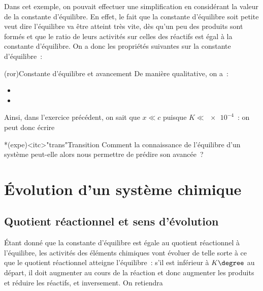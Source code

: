 \documentclass[../../main/main.tex]{subfiles}
\begin{document}
Dans cet exemple, on pouvait effectuer une simplification en considérant la
valeur de la constante d'équilibre. En effet, le fait que la constante
d'équilibre soit petite veut dire l'équilibre va être atteint très vite, dès
qu'un peu des produits sont formés et que le ratio de leurs activités sur celles
des réactifs est égal à la constante d'équilibre. On a donc les propriétés
suivantes sur la constante d'équilibre~:

\begin{tcb}[label=prop:K](ror){Constante d'équilibre et avancement}
	De manière qualitative, on a~:
	\begin{itemize}
		\item {}
		\item {}
	\end{itemize}
\end{tcb}

Ainsi, dans l'exercice précédent, on sait que $x \ll c$ puisque $K \ll
	\num{e-4}$~: on peut donc écrire
\psw{
\[
	K = \frac{x_f{}^2}{c}
	\Lra
	x_f = \sqrt{Kc} = \SI{1.33e-3}{mol.L^{-1}}
\]
}

\begin{tcb}*(expe)<itc>"trans"{Transition}
	Comment la connaissance de l'équilibre d'un système peut-elle alors nous
	permettre de prédire son avancée~?
\end{tcb}

\section{Évolution d'un système chimique}
\subsection{Quotient réactionnel et sens d'évolution}

Étant donné que la constante d'équilibre est égale au quotient réactionnel à
l'équilibre, les activités des éléments chimiques vont évoluer de telle sorte à
ce que le quotient réactionnel atteigne l'équilibre~: s'il est inférieur à
$K\degree$ au départ, il doit augmenter au cours de la réaction et donc
augmenter les produits et réduire les réactifs, et inversement. On retiendra
\end{document}
